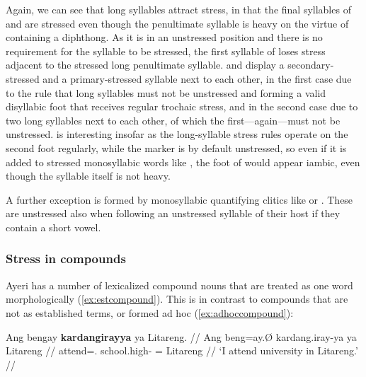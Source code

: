 Again, we can see that long syllables attract stress, in that the final 
syllables of  and  are 
stressed even though the penultimate syllable is heavy on the virtue of 
containing a diphthong. As it is in an unstressed position and there is no 
requirement for the syllable to be stressed, the first syllable of 
 loses stress adjacent to the stressed long 
penultimate syllable.  and  
display a secondary-stressed and a primary-stressed syllable next to each other, 
in the first case due to the rule that long syllables must not be unstressed 
and  forming a valid disyllabic foot that receives regular 
trochaic stress, and in the second case due to two long syllables next to each 
other, of which the first---again---must not be unstressed. 
 is interesting insofar as the long-syllable 
stress rules operate on the second foot regularly, while the marker 
 is by default unstressed, so even if it is added to 
stressed monosyllabic words like 
, the foot of  
would appear iambic, even though the syllable  itself is not 
heavy.

A further exception is formed by monosyllabic quantifying clitics like 
 or . These are 
unstressed also when following an unstressed syllable of their host if they 
contain a short vowel.


\subsubsection{Stress in compounds}

Ayeri has a number of lexicalized compound nouns that are treated 
as one word morphologically (\ref{ex:estcompound}). This is in contrast to 
compounds that are not as established terms, or formed ad hoc 
(\ref{ex:adhoccompound}):

\pex
\a\label{ex:estcompound}\begingl
	\gla Ang bengay \textbf{kardangirayya} ya Litareng. //
	\glb Ang beng=ay.Ø kardang.iray-ya ya Litareng //
	\glc \AgtT{} attend=\Fsg{}.\Top{} school.high-\Loc{} \Loc{}= Litareng //
	\glft `I attend university in Litareng.' //
\endgl

